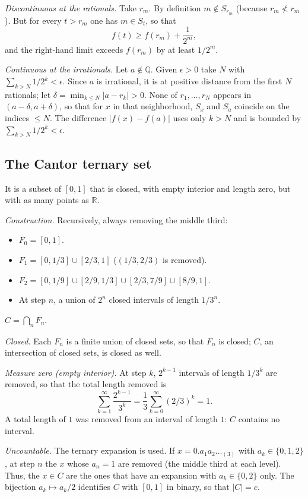 \documentclass[11pt, a4paper]{article}
\begin{document}
\textit{Discontinuous at the rationals.} Take $r_m$. By definition $m \notin S_{r_m}$ (because
$r_m \not< r_m$). But for every $t > r_m$ one has $m \in S_t$, so that
$$ f(t) \ge f(r_m) + \frac{1}{2^m}, $$
and the right-hand limit exceeds $f(r_m)$ by at least $1/2^m$.

\textit{Continuous at the irrationals.} Let $a \notin \mathbb{Q}$.
Given $\epsilon > 0$ take $N$ with $\sum_{k > N} 1/2^k < \epsilon$.
Since $a$ is irrational, it is at positive distance from the first $N$ rationals;
let $\delta = \min_{k \le N} |a - r_k| > 0$.
None of $r_1, \dots, r_N$ appears in $(a - \delta, a + \delta)$,
so that for $x$ in that neighborhood, $S_x$ and $S_a$ coincide on the indices $\le N$.
The difference $|f(x) - f(a)|$ uses only $k > N$ and is bounded by
$\sum_{k > N} 1/2^k < \epsilon$.

\subsection{The Cantor ternary set}

It is a subset of $[0, 1]$ that is closed, with empty interior and length zero, but with as many points
as $\mathbb{R}$.

\textit{Construction.} Recursively, always removing the middle third:
\begin{itemize}
    \item $F_0 = [0, 1]$.
    \item $F_1 = [0, 1/3] \cup [2/3, 1]$ ($(1/3, 2/3)$ is removed).
    \item $F_2 = [0, 1/9] \cup [2/9, 1/3] \cup [2/3, 7/9] \cup [8/9, 1]$.
    \item At step $n$, a union of $2^n$ closed intervals of length $1/3^n$.
\end{itemize}
$C = \bigcap_n F_n$.

\textit{Closed.} Each $F_n$ is a finite union of closed sets, so that $F_n$ is closed; $C$,
an intersection of closed sets, is closed as well.

\textit{Measure zero (empty interior).} At step $k$, $2^{k-1}$ intervals of length
$1/3^k$ are removed, so that the total length removed is
$$ \sum_{k=1}^\infty \frac{2^{k-1}}{3^k} = \frac{1}{3} \sum_{k=0}^\infty (2/3)^k = 1. $$
A total length of $1$ was removed from an interval of length $1$: $C$ contains no interval.

\textit{Uncountable.} The ternary expansion is used. If $x = 0.a_1a_2\dots_{(3)}$ with
$a_k \in \{0,1,2\}$, at step $n$ the $x$ whose $a_n = 1$ are removed (the middle third at each
level). Thus, the $x \in C$ are the ones that have an expansion with $a_k \in \{0, 2\}$ only.
The bijection $a_k \mapsto a_k/2$ identifies $C$ with $[0,1]$ in binary, so that $|C| = c$.
\end{document}
